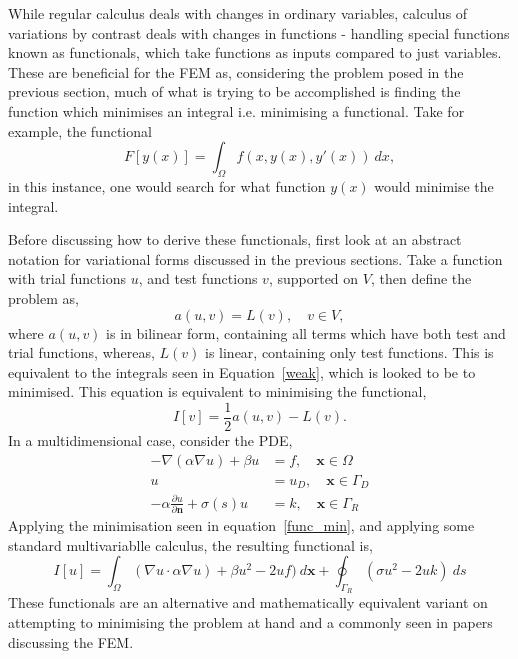 While regular calculus deals with changes in ordinary variables, calculus of variations by contrast deals with changes in functions - handling special functions  known as functionals, which take functions as inputs compared to just variables. These are beneficial for the FEM as, considering the problem posed in the previous section, much of what is trying to be accomplished is finding the function which minimises an integral i.e. minimising a functional. Take for example, the functional 
\begin{equation}
	F[y(x)] = \int_\Omega f(x, y(x),y'(x))~dx,
\end{equation}
in this instance, one would search for what function $y(x)$ would minimise the integral.

Before discussing how to derive these functionals, first look at an abstract notation for variational forms discussed in the previous sections. Take a function with trial functions $u$, and test functions $v$, supported on $V$, then define the problem as,
\begin{equation}
	a(u,v) = L(v),\quad v\in V,
\end{equation}
where $a(u,v)$ is in bilinear form, containing all terms which have both test and trial functions, whereas, $L(v)$ is linear, containing only test functions. This is equivalent to the integrals seen in Equation~\eqref{weak}, which is looked to be to minimised. This equation is equivalent to minimising the functional,
\begin{equation}\label{func_min}
	I[v] = \frac{1}{2}a(u,v) - L(v). 
\end{equation}
In a multidimensional case, consider the PDE,
\begin{align}
	-\nabla(\alpha\nabla u) + \beta u &= f,\quad \mathbf{x} \in \Omega\\
	u &= u_D,\quad \mathbf{x} \in \Gamma_D\\
	-\alpha \frac{\partial u}{\partial \mathbf{n}} + \sigma(s) u &= k,\quad \mathbf{x}\in \Gamma_R	
\end{align}
Applying the minimisation seen in equation~\eqref{func_min}, and applying some standard multivariablle calculus, the resulting functional is,
\begin{equation}
	I[u] = \int_\Omega (\nabla u\cdot \alpha \nabla u) + \beta u^2 - 2 u f)~d\mathbf{x} + \oint_{\Gamma_R} (\sigma u^2 - 2 u k)~ds
\end{equation}
These functionals are an alternative and mathematically equivalent variant on attempting to minimising the problem at hand and a commonly seen in papers discussing the FEM. \cite{davies}


